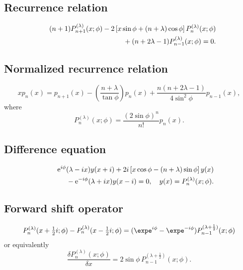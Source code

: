 \documentclass[envcountchap,graybox]{svmono}
\newcommand{\mathindent}{\hspace{7.5mm}}
\newcommand{\e}{\textrm{e}}
\begin{document}
\subsection*{Recurrence relation}
\begin{eqnarray}
\label{RecMP}
& &(n+1)P_{n+1}^{(\lambda)}(x;\phi)-2\left[x\sin\phi+(n+\lambda)\cos\phi\right]
P_n^{(\lambda)}(x;\phi)\nonumber\\
& &{}\mathindent{}+(n+2\lambda-1)P_{n-1}^{(\lambda)}(x;\phi)=0.
\end{eqnarray}

\subsection*{Normalized recurrence relation}
\begin{equation}
\label{NormRecMP}
xp_n(x)=p_{n+1}(x)-\left(\frac{n+\lambda}{\tan\phi}\right)p_n(x)+
\frac{n(n+2\lambda-1)}{4\sin^2\phi}p_{n-1}(x),
\end{equation}
where
$$P_n^{(\lambda)}(x;\phi)=\frac{(2\sin\phi)^n}{n!}p_n(x).$$

\subsection*{Difference equation}
\begin{eqnarray}
\label{dvMP}
& &\e^{i\phi}(\lambda-ix)y(x+i)+2i\left[x\cos\phi-(n+\lambda)\sin\phi\right]y(x)\nonumber\\
& &{}\mathindent{}-\e^{-i\phi}(\lambda+ix)y(x-i)=0,\quad y(x)=P_n^{(\lambda)}(x;\phi).
\end{eqnarray}

\subsection*{Forward shift operator}
\begin{equation}
\label{shift1MPI}
P_n^{(\lambda)}(x+\textstyle\frac{1}{2}i;\phi)-
P_n^{(\lambda)}(x-\textstyle\frac{1}{2}i;\phi)=(\expe^{i\phi}-\expe^{-i\phi})
P_{n-1}^{(\lambda+\frac{1}{2})}(x;\phi)
\end{equation}
or equivalently
\begin{equation}
\label{shift1MPII}
\frac{\delta P_n^{(\lambda)}(x;\phi)}{\delta x}
=2\sin\phi\,P_{n-1}^{(\lambda+\frac{1}{2})}(x;\phi).
\end{equation}
\end{document}
